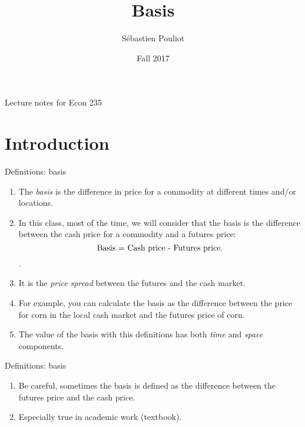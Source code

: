 \documentclass[table,xcolor=pdftex,dvipsnames]{beamer}\usepackage[]{graphicx}\usepackage[]{color}
\title[Basis]{Basis}
\author[Pouliot]{S\'{e}bastien Pouliot}
\institute{Iowa State University}
\date{Fall 2017}
\begin{document}

\begin{frame}
\titlepage
\vspace{-0.4in}
\begin{center}
Lecture notes for Econ 235\\
\end{center}
\end{frame}

\section{Introduction}

\begin{frame}{Definitions: basis}
\begin{enumerate}[label=\textbullet]
  \item The \emph{basis} is the difference in price for a commodity at different times and/or locations.
  \item In this class, most of the time, we will consider that the basis is the difference between the cash price for a commodity and a futures price: \[ \textnormal{Basis = Cash price - Futures price.} \].
  \vspace{-1\baselineskip}
  \item It is the \emph{price spread} between the futures and the cash market.
  \item For example, you can calculate the basis as the difference between the price for corn in the local cash market and the futures price of corn.
  \item The value of the basis with this definitions has both \emph{time} and \emph{space} components.
\end{enumerate}
\end{frame}


\begin{frame}{Definitions: basis}
\begin{enumerate}[label=\textbullet]
  \item Be careful, sometimes the basis is defined as the difference between the futures price and the cash price.
  \item Especially true in academic work (textbook).
\end{enumerate}
\end{frame}
\end{document}
